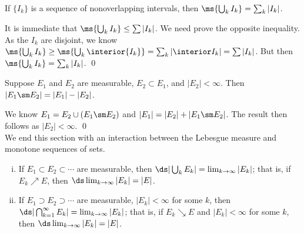 \begin{cor}
If $\{I_k\}$ is a sequence of nonoverlapping intervals, then $\ms{\bigcup_k I_k}= \sum_k |I_k|$. 
\end{cor}

\pf It is immediate that $\ms{\bigcup_k I_k} \leq \sum |I_k|$. We need prove the opposite inequality. As the $I_k$ are disjoint, we know $\ms{\bigcup_k I_k} \geq \ms{\bigcup_k \interior{I_k}}= \sum_k |\interior I_k|= \sum |I_k|$. But then $\ms{\bigcup_k I_k}= \sum_k |I_k|$. \qed \\


\begin{cor}
Suppose $E_1$ and $E_2$ are measurable, $E_2 \subset E_1$, and $|E_2|<\infty$. Then $|E_1 \sm E_2|= |E_1| - |E_2|$. 
\end{cor}

\pf We know $E_1= E_2 \cup (E_1 \sm E_2)$ and $|E_1|= |E_2| + |E_1 \sm E_2|$. The result then follows as $|E_2|<\infty$. \qed \\


We end this section with an interaction between the Lebesgue measure and monotone sequences of sets.


\begin{prop} \hfill \label{prop:incdecsubad}
\begin{enumerate}[(i)]
\item If $E_1 \subset E_2 \subset \cdots$ are measurable, then $\ds|\bigcup_k E_k|= \lim_{k \to \infty} |E_k|$; that is, if $E_k \nearrow E$, then $\ds\lim_{k \to \infty} |E_k|=|E|$.
\item If $E_1 \supset E_2 \supset \cdots$ are measurable, $|E_k|<\infty$ for some $k$, then $\ds|\bigcap_{k=1}^\infty E_k|= \lim_{k \to \infty} |E_k|$; that is, if $E_k \searrow E$ and $|E_k|<\infty$ for some $k$, then $\ds\lim_{k \to \infty} |E_k|=|E|$. 
\end{enumerate}
\end{prop}

